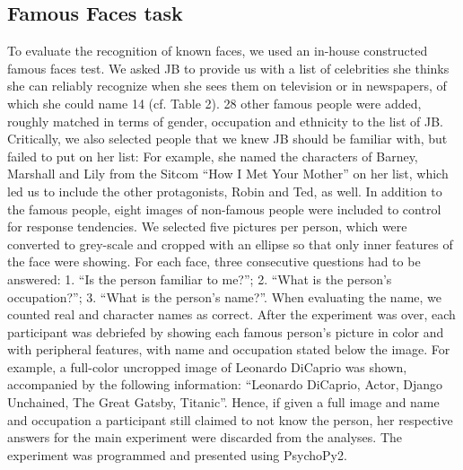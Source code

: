 \documentclass[fleqn,10pt]{SelfArx} %
\begin{document}
\subsection*{Famous Faces task}
To evaluate the recognition of known faces, we used an in-house constructed famous faces test. We asked JB to provide us with a list of celebrities she thinks she can reliably recognize when she sees them on television or in newspapers, of which she could name 14 (cf. Table 2). 28 other famous people were added, roughly matched in terms of gender, occupation and ethnicity to the list of JB. Critically, we also selected people that we knew JB should be familiar with, but failed to put on her list: For example, she named the characters of Barney, Marshall and Lily from the Sitcom “How I Met Your Mother” on her list, which led us to include the other protagonists, Robin and Ted, as well. In addition to the famous people, eight images of non-famous people were included to control for response tendencies. We selected five pictures per person, which were converted to grey-scale and cropped with an ellipse so that only inner features of the face were showing.
For each face, three consecutive questions had to be answered: 1. “Is the person familiar to me?”; 2. “What is the person's occupation?”; 3. “What is the person's name?”. When evaluating the name, we counted real and character names as correct. After the experiment was over, each participant was debriefed by showing each famous person's picture in color and with peripheral features, with name and occupation stated below the image. For example, a full-color uncropped image of Leonardo DiCaprio was shown, accompanied by the following information: “Leonardo DiCaprio, Actor, Django Unchained, The Great Gatsby, Titanic”. Hence, if given a full image and name and occupation a participant still claimed to not know the person, her respective answers for the main experiment were discarded from the analyses. The experiment was programmed and presented using PsychoPy2.
\end{document}
